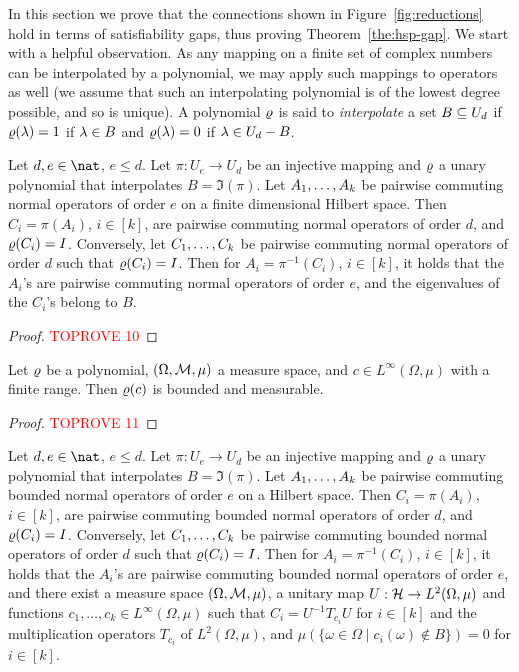 \documentclass[11pt,letter]{article}
\begin{document}
In this section we prove that the connections shown in
Figure~\ref{fig:reductions} hold in terms of satisfiability gaps, thus proving
Theorem~\ref{the:hsp-gap}. We start with a helpful observation. As any mapping on a finite set of complex numbers can be interpolated by a polynomial, we may apply such mappings to operators as well (we assume that such an interpolating polynomial is of the lowest degree possible, and so is unique). A polynomial $\varrho$ is said to \emph{interpolate} a set $B\subseteq U_d$ if $\varrho(\lambda)=1$ if $\lambda\in B$ and $\varrho(\lambda)=0$ if $\lambda\in U_d-B$.

\begin{lemma}\label{lem:mapping}
Let $d,e\in\nat$, $e\le d$. 
Let $\pi:U_e\to U_d$ be an injective mapping and $\varrho$ a unary polynomial that interpolates $B=\Im(\pi)$.  Let $A _1,\ldots, A _{k}$ be pairwise commuting normal operators of order $e$ on a finite dimensional Hilbert space. Then $C_i=\pi(A_i)$, $i\in[k]$, are pairwise commuting normal operators of order $d$, and $\varrho(C_i)=I$. Conversely, let $C _1,\ldots, C _{k}$ be pairwise commuting normal operators of order $d$ such that $\varrho(C_i)=I$. Then for $A_i=\pi^{-1}(C_i)$, $i\in[k]$, it holds that the $A_i$'s are pairwise commuting normal operators of order $e$, and the eigenvalues of the $C_i$'s belong to $B$.
\end{lemma}

\begin{proof}\textcolor{red}{TOPROVE 10}\end{proof}

\begin{lemma}\label{lem:polynomial-image}
Let $\varrho$ be a polynomial, $(\Omega,{\mathcal M},\mu)$ a measure space, and $c\in L^\infty(\Omega,\mu)$ with a finite range. Then $\varrho(c)$ is bounded and measurable.
\end{lemma}

\begin{proof}\textcolor{red}{TOPROVE 11}\end{proof}

\begin{lemma}\label{lem:mapping-infinite}
Let $d,e\in\nat$, $e\le d$. 
Let $\pi:U_e\to U_d$ be an injective mapping and $\varrho$ a unary polynomial that interpolates $B=\Im(\pi)$.  Let $A _1,\ldots, A _{k}$ be pairwise commuting bounded normal operators of order $e$ on a Hilbert space. Then $C_i=\pi(A_i)$, $i\in[k]$, are pairwise commuting bounded normal operators of order $d$, and $\varrho(C_i)=I$. Conversely, let $C _1,\ldots, C _{k}$ be pairwise commuting bounded normal operators of order $d$ such that $\varrho(C_i)=I$. Then for $A_i=\pi^{-1}(C_i)$, $i\in[k]$, it holds that the $A_i$'s are pairwise commuting bounded normal operators of order $e$, and there exist a measure space $(\Omega,{\mathcal M},\mu)$, a unitary map $U:{\mathcal H}\to L^2(\Omega,\mu)$ and functions $c_1,\dots,c_k\in L^\infty(\Omega,\mu)$ such that $C_i = U^{-1} T_{c_i}U$ for $i\in [k]$ and the multiplication operators $T_{c_i}$ of $L^2(\Omega,\mu)$, and $\mu(\{\omega\in\Omega\mid c_i(\omega)\not\in B\}) = 0$ for $i\in[k]$.
\end{lemma}
\end{document}
